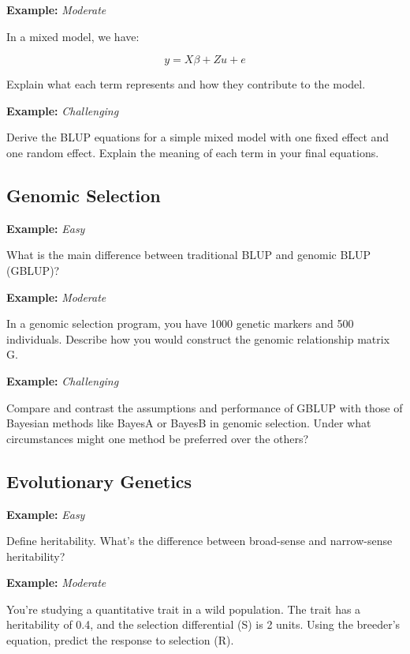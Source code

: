 \documentclass[12pt,a4paper]{article}
\newenvironment{example}[1][]
{\begin{basebox}[linecolor=uqgold]
\textbf{\color{uqgold}Example:} \textit{#1}\par\noindent\ignorespaces}
{\end{basebox}}
\begin{document}
\begin{example}[Moderate]
In a mixed model, we have:

\[
y = X\beta + Zu + e
\]

Explain what each term represents and how they contribute to the model.
\end{example}

\begin{example}[Challenging]
Derive the BLUP equations for a simple mixed model with one fixed effect and one random effect. Explain the meaning of each term in your final equations.
\end{example}

\subsection{Genomic Selection}

\begin{example}[Easy]
What is the main difference between traditional BLUP and genomic BLUP (GBLUP)?
\end{example}

\begin{example}[Moderate]
In a genomic selection program, you have 1000 genetic markers and 500 individuals. Describe how you would construct the genomic relationship matrix G.
\end{example}

\begin{example}[Challenging]
Compare and contrast the assumptions and performance of GBLUP with those of Bayesian methods like BayesA or BayesB in genomic selection. Under what circumstances might one method be preferred over the others?
\end{example}

\subsection{Evolutionary Genetics}

\begin{example}[Easy]
Define heritability. What's the difference between broad-sense and narrow-sense heritability?
\end{example}

\begin{example}[Moderate]
You're studying a quantitative trait in a wild population. The trait has a heritability of 0.4, and the selection differential (S) is 2 units. Using the breeder's equation, predict the response to selection (R).
\end{example}
\end{document}
